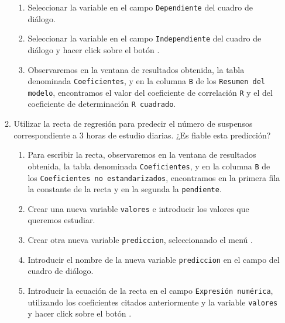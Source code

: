 \begin{enumerate}[leftmargin=*]
\begin{enumerate}
\begin{indicacion}
{\begin{enumerate}
\item Seleccionar la variable  en el campo
\texttt{Dependiente} del cuadro de diálogo.

\item Seleccionar la variable  en el campo
\texttt{Independiente} del cuadro de diálogo y hacer click sobre
el botón .

\item Observaremos en la ventana de resultados obtenida, la tabla
denominada \texttt{Coeficientes}, y en la columna \texttt{B} de
los \texttt{Resumen del modelo}, encontramos el valor del
coeficiente de correlación \texttt{R} y el del coeficiente de
determinación \texttt{R cuadrado}.


\end{enumerate}}
\end{indicacion}


\item Utilizar la recta de regresión para predecir el número de
suspensos correspondiente a 3 horas de estudio diarias. ¿Es fiable
esta predicción?

\begin{indicacion}{
\begin{enumerate}

\item Para escribir la recta, observaremos en la ventana de
resultados obtenida, la tabla denominada \texttt{Coeficientes}, y
en la columna \texttt{B} de los \texttt{Coeficientes no
estandarizados}, encontramos en la primera fila la
\textsf{constante} de la recta y en la segunda la
\texttt{pendiente}.

\item Crear una nueva variable \texttt{valores} e introducir los
valores que queremos estudiar.

\item Crear otra nueva variable \texttt{prediccion}, seleccionando
el  menú .

\item  Introducir el nombre de la nueva variable
\texttt{prediccion} en el campo  del
cuadro de diálogo.

\item Introducir la ecuación de la recta en el campo
\texttt{Expresión numérica}, utilizando los coeficientes citados
anteriormente  y la variable \texttt{valores} y hacer click sobre
el botón .
\end{enumerate}}
\end{indicacion}



\end{enumerate}
\end{enumerate}
